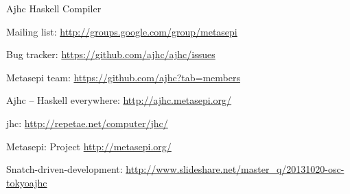 \begin{hcarentry}{Ajhc Haskell Compiler}
\Contact
  \begin{compactitem}
    \item Mailing list: \url{http://groups.google.com/group/metasepi}
    \item Bug tracker: \url{https://github.com/ajhc/ajhc/issues}
    \item Metasepi team: \url{https://github.com/ajhc?tab=members}
  \end{compactitem}

\FurtherReading
  \begin{compactitem}
    \item Ajhc -- Haskell everywhere: \url{http://ajhc.metasepi.org/}
    \item jhc: \url{http://repetae.net/computer/jhc/}
    \item Metasepi: Project \url{http://metasepi.org/}
    \item Snatch-driven-development: \url{http://www.slideshare.net/master\_q/20131020-osc-tokyoajhc}
  \end{compactitem}
\end{hcarentry}
